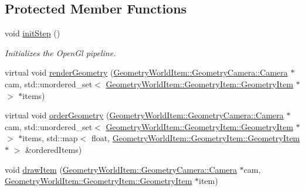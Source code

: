 \subsection*{Protected Member Functions}
\begin{DoxyCompactItemize}
\item 
\mbox{\label{class_geometry_engine_1_1_geometry_render_step_1_1_geometry_pass_a23575018d6032000ac8f2751efcc2240}} 
void \mbox{\hyperlink{class_geometry_engine_1_1_geometry_render_step_1_1_geometry_pass_a23575018d6032000ac8f2751efcc2240}{init\+Step}} ()
\begin{DoxyCompactList}\small\item\em Initializes the Open\+Gl pipeline. \end{DoxyCompactList}\item 
virtual void \mbox{\hyperlink{class_geometry_engine_1_1_geometry_render_step_1_1_geometry_pass_a2929c4675eb93efd992739baac565425}{render\+Geometry}} (\mbox{\hyperlink{class_geometry_engine_1_1_geometry_world_item_1_1_geometry_camera_1_1_camera}{Geometry\+World\+Item\+::\+Geometry\+Camera\+::\+Camera}} $\ast$cam, std\+::unordered\+\_\+set$<$ \mbox{\hyperlink{class_geometry_engine_1_1_geometry_world_item_1_1_geometry_item_1_1_geometry_item}{Geometry\+World\+Item\+::\+Geometry\+Item\+::\+Geometry\+Item}} $\ast$ $>$ $\ast$items)
\item 
virtual void \mbox{\hyperlink{class_geometry_engine_1_1_geometry_render_step_1_1_geometry_pass_a7ffab46f648d6a501218086039bb0ab4}{order\+Geometry}} (\mbox{\hyperlink{class_geometry_engine_1_1_geometry_world_item_1_1_geometry_camera_1_1_camera}{Geometry\+World\+Item\+::\+Geometry\+Camera\+::\+Camera}} $\ast$cam, std\+::unordered\+\_\+set$<$ \mbox{\hyperlink{class_geometry_engine_1_1_geometry_world_item_1_1_geometry_item_1_1_geometry_item}{Geometry\+World\+Item\+::\+Geometry\+Item\+::\+Geometry\+Item}} $\ast$ $>$ $\ast$items, std\+::map$<$ float, \mbox{\hyperlink{class_geometry_engine_1_1_geometry_world_item_1_1_geometry_item_1_1_geometry_item}{Geometry\+World\+Item\+::\+Geometry\+Item\+::\+Geometry\+Item}} $\ast$ $>$ \&ordered\+Items)
\item 
void \mbox{\hyperlink{class_geometry_engine_1_1_geometry_render_step_1_1_geometry_pass_a0e3189d5f441ada51ef31e09f100e270}{draw\+Item}} (\mbox{\hyperlink{class_geometry_engine_1_1_geometry_world_item_1_1_geometry_camera_1_1_camera}{Geometry\+World\+Item\+::\+Geometry\+Camera\+::\+Camera}} $\ast$cam, \mbox{\hyperlink{class_geometry_engine_1_1_geometry_world_item_1_1_geometry_item_1_1_geometry_item}{Geometry\+World\+Item\+::\+Geometry\+Item\+::\+Geometry\+Item}} $\ast$item)

\end{DoxyCompactItemize}
